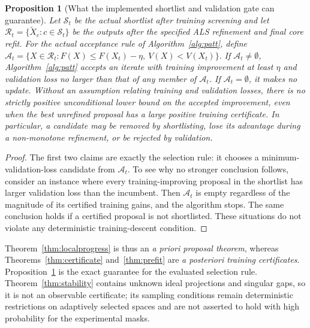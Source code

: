 \documentclass[review,10pt]{elsarticle}
\newtheorem{proposition}{Proposition}
\begin{document}
\begin{proposition}[What the implemented shortlist and validation gate can guarantee]\label{prop:acceptance}
Let $\mathcal S_t$ be the actual shortlist after training screening and let $\mathcal R_t=\{\widetilde X_c:c\in\mathcal S_t\}$ be the outputs \emph{after} the specified ALS refinement and final core refit. For the actual acceptance rule of Algorithm~\ref{alg:patt}, define
 \(\mathcal A_t=\{X\in\mathcal R_t:F(X)\le F(X_t)-\eta,\ V(X)<V(X_t)\}.\) 
If $\mathcal A_t\ne\emptyset$, Algorithm~\ref{alg:patt} accepts an iterate with training improvement at least $\eta$ and validation loss no larger than that of any member of $\mathcal A_t$. If $\mathcal A_t=\emptyset$, it makes no update. Without an assumption relating training and validation losses, \emph{there is no strictly positive unconditional lower bound} on the accepted improvement, even when the best unrefined proposal has a large positive training certificate. In particular, a candidate may be removed by shortlisting, lose its advantage during a non-monotone refinement, or be rejected by validation.
\end{proposition}
\begin{proof}
The first two claims are exactly the selection rule: it chooses a minimum-validation-loss candidate from $\mathcal A_t$. To see why no stronger conclusion follows, consider an instance where every training-improving proposal in the shortlist has larger validation loss than the incumbent. Then $\mathcal A_t$ is empty regardless of the magnitude of its certified training gains, and the algorithm stops. The same conclusion holds if a certified proposal is not shortlisted. These situations do not violate any deterministic training-descent condition.\end{proof}

Theorem~\ref{thm:localprogress} is thus an \emph{a priori proposal theorem}, whereas Theorems~\ref{thm:certificate} and~\ref{thm:prefit} are \emph{a posteriori training certificates}. Proposition~\ref{prop:acceptance} is the exact guarantee for the evaluated selection rule. Theorem~\ref{thm:stability} contains unknown ideal projections and singular gaps, so it is not an observable certificate; its sampling conditions remain deterministic restrictions on adaptively selected spaces and are not asserted to hold with high probability for the experimental masks.
\end{document}
